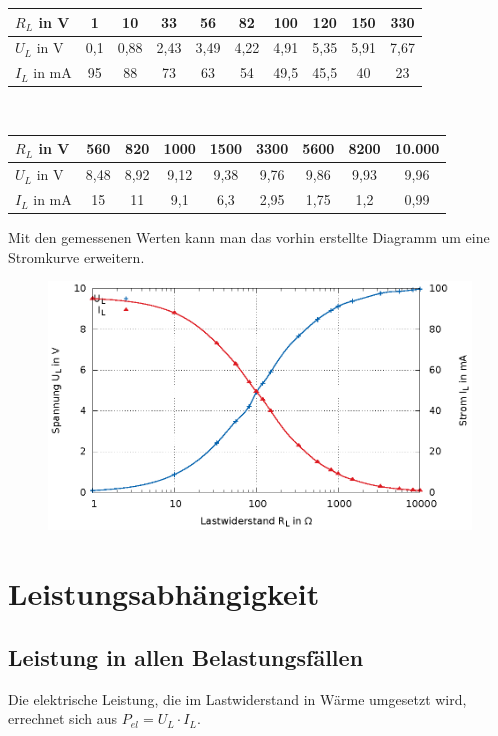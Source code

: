 \documentclass[
a4paper,     %
 headsepline, %
11pt         %
]{scrartcl}  %
\begin{document}
\begin{flushleft}
\begin{tabular}{ l | c | c | c | c | c | c | c | c | c  }
    \hline
    $R_L$ in V   & 1    & 10   & 33   & 56   & 82   & 100  & 120  & 150  & 330         \\ \hline
    $U_L$ in V   & 0,1  & 0,88 & 2,43 & 3,49 & 4,22 & 4,91 & 5,35 & 5,91 & 7,67      \\ \hline
    $I_L$ in mA  & 95   & 88   & 73   & 63   & 54   & 49,5 & 45,5 & 40   & 23      \\
    \hline
\end{tabular} \\
\begin{tabular}{ l | c | c | c | c | c | c | c | c }
    \hline
    $R_L$ in V   & 560  & 820  & 1000  & 1500 & 3300 & 5600  & 8200  & 10.000   \\ \hline
    $U_L$ in V   & 8,48 & 8,92 & 9,12  & 9,38 & 9,76 & 9,86  & 9,93  & 9,96    \\ \hline
    $I_L$ in mA  & 15   & 11   & 9,1   & 6,3  & 2,95 & 1,75  & 1,2   & 0,99    \\
    \hline
\end{tabular}
\end{flushleft}
Mit den gemessenen Werten kann man das vorhin erstellte Diagramm um eine Stromkurve erweitern.
\begin{figure}[hbtp]
\centering
\includegraphics[scale=1]{diagramm_spannung_strom.eps}
\end{figure}


\section{Leistungsabhängigkeit}
\subsection{Leistung in allen Belastungsfällen}
Die elektrische Leistung, die im Lastwiderstand in Wärme umgesetzt wird, errechnet sich aus $P_{el}=U_{L} \cdot I_L$.
\end{document}
